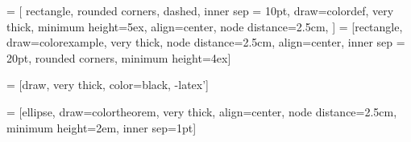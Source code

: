  = [
  rectangle, rounded corners, dashed,
  inner sep = 10pt,
  draw=colordef, very thick,
  minimum height=5ex,
  align=center,
  node distance=2.5cm,
  ]
   =
  [rectangle,
  draw=colorexample, very thick,
  node distance=2.5cm,
  align=center,
  inner sep = 20pt,
  rounded corners, 
  minimum height=4ex]
  
 = [draw, very thick, color=black, -latex']

 =
  [ellipse, draw=colortheorem,
  very thick,
  align=center, node distance=2.5cm,
  minimum height=2em, inner sep=1pt]

% 


  
